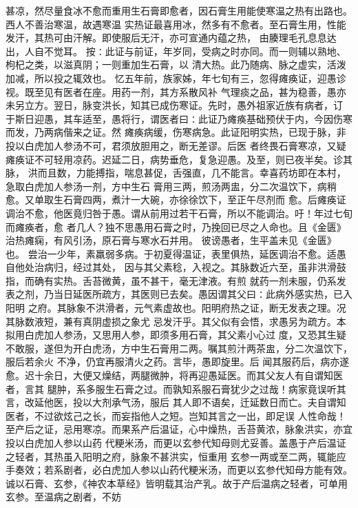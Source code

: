 \documentclass[a4paper,12pt,UTF8,twoside]{ctexbook}
\begin{document}
甚凉，然尽量食冰不愈而重用生石膏即愈者，因石膏生用能使寒温之热有出路也。西人不善治寒温，故遇寒温 
实热证最喜用冰，然多有不愈者。至石膏生用，性能发汗，其热可由汗解。即使服后无汗，亦可宣通内蕴之热， 
由腠理毛孔息息达出，人自不觉耳。 
按∶此证与前证，年岁同，受病之时亦同。而一则辅以熟地、枸杞之类，以滋真阴；一则重加生石膏，以 
清大热。此乃随病、脉之虚实，活泼加减，所以投之辄效也。 
忆五年前，族家姊，年七旬有三，忽得瘫痪证，迎愚诊视。既至见有医者在座。用药一剂，其方系散风补 
气理痰之品，甚为稳善，愚亦未另立方。翌日，脉变洪长，知其已成伤寒证。先时，愚外祖家近族有病者，订 
于斯日迎愚，其车适至，愚将行，谓医者曰∶此证乃瘫痪基础预伏于内，今因伤寒而发，乃两病偕来之证。然 
瘫痪病缓，伤寒病急。此证阳明实热，已现于脉，非投以白虎加人参汤不可，君须放胆用之，断无差谬。后医 
者终畏石膏寒凉，又疑瘫痪证不可轻用凉药。迟延二日，病势垂危，复急迎愚。及至，则已夜半矣。诊其脉， 
洪而且数，力能搏指，喘息甚促，舌强直，几不能言。幸喜药坊即在本村，急取白虎加人参汤一剂，方中生石 
膏用三两，煎汤两盅，分二次温饮下，病稍愈。又单取生石膏四两，煮汁一大碗，亦徐徐饮下，至正午尽剂而 
愈。后瘫痪证调治不愈，他医竟归咎于愚。谓从前用过若干石膏，所以不能调治。吁！年过七旬而瘫痪者，愈 
者几人？独不思愚用石膏之时，乃挽回已尽之人命也。且《金匮》治热瘫痫，有风引汤，原石膏与寒水石并用。 
彼谤愚者，生平盖未见《金匮》也。 
尝治一少年，素羸弱多病。于初夏得温证，表里俱热，延医调治不愈。适愚自他处治病归，经过其处， 
因与其父素稔，入视之。其脉数近六至，虽非洪滑鼓指，而确有实热。舌苔微黄，虽不甚干，毫无津液。有煎 
就药一剂未服，仍系发表之剂，乃当日延医所疏方，其医则已去矣。愚因谓其父曰∶此病外感实热，已入阳明 
之府。其脉象不洪滑者，元气素虚故也。阳明府热之证，断无发表之理。况其脉数液短，兼有真阴虚损之象尤 
忌发汗乎。其父似有会悟，求愚另为疏方。本拟用白虎加人参汤，又思用人参，即须多用石膏，其父素小心过 
度，又恐其生疑不敢服，遂但为开白虎汤，方中生石膏用二两。嘱其煎汁两茶盅，分二次温饮下，服后若余火 
不净，仍宜再服清火之药。言毕，愚即旋里。后 
闻其服药后，病亦遂愈。迟十余日，大便又燥结，两腿微肿，将再迎愚延医。而其父友人有自谓知医者，言其 
腿肿，系多服生石膏之过。而孰知系服石膏犹少之过哉！病家竟误听其言，改延他医，投以大剂承气汤，服后 
其人即不语矣，迁延数日而亡。夫自谓知医者，不过欲炫己之长，而妄指他人之短。岂知其言之一出，即足误 
人性命哉！ 
至产后之证，忌用寒凉。而果系产后温证，心中燥热，舌苔黄浓，脉象洪实，亦宜投以白虎加人参以山药 
代粳米汤，而更以玄参代知母则尤妥善。盖愚于产后温证之轻者，其热虽入阳明之府，脉象不甚洪实，恒重用 
玄参一两或至二两，辄能应手奏效；若系剧者，必白虎加人参以山药代粳米汤，而更以玄参代知母方能有效。 
诚以石膏、玄参，《神农本草经》皆明载其治产乳。故于产后温病之轻者，可单用玄参。至温病之剧者，不妨 
\end{document}
